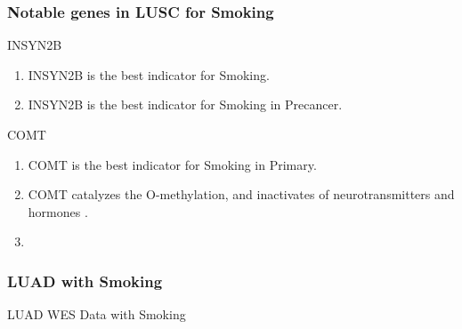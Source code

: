 \documentclass{beamer}
\begin{document}
    \begin{frame}[allowframebreaks]
        \frametitle{Notable genes in LUSC for Smoking}

        \begin{block}{INSYN2B}
            \begin{enumerate}
                \item INSYN2B is the best indicator for Smoking.
                \item INSYN2B is the best indicator for Smoking in Precancer.
            \end{enumerate}
        \end{block}

        \begin{block}{COMT}
            \begin{enumerate}
                \item COMT is the best indicator for Smoking in Primary.
                \item COMT catalyzes the O-methylation, and inactivates of neurotransmitters and hormones \cite{COMT-1, COMT-2}.
                \item
            \end{enumerate}
        \end{block}
    \end{frame}

    \begin{frame}
        \frametitle{LUAD with Smoking}

        \begin{table}
            \caption{LUAD WES Data with Smoking}
            \resizebox{!}{0.3 \textheight}
            {}
        \end{table}
    \end{frame}
\end{document}
